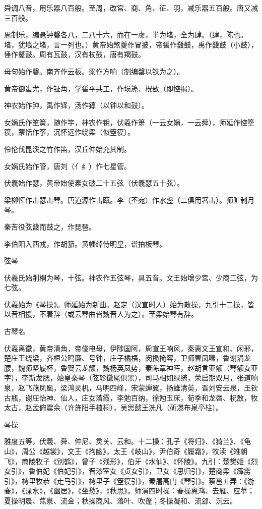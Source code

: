 \documentclass[a4paper,12pt,UTF8,twoside]{ctexbook}
\begin{document}
    舜调八音，用乐器八百般。至周，改宫、商、角、征、羽，减乐器五百般。唐又减三百般。
    
    周制乐，编悬钟磬各八，二八十六，而在一虡，半为堵，全为肆。（肆，陈也。堵，犹墙之堵，言一列也。）黄帝始煞夔作冒披，帝喾作鼗鼓，禹作鼗鼓（小鼓），倕作鼙鼓。周有瓦鼓，汉有杖鼓，唐有羯鼓。
    
    母句始作磬。南齐作云板。梁作方响（制编罄以铁为之）。
    
    黄帝御蚩尤，作钲角，学喾平共工，作埙箎、柷敔（即控揭）。
    
    神农始作钟，禹作铎，汤作錞（以钟以和鼓）。
    
    女娲氏作笙簧，随作竽，神农作钥，伏羲作箫（一云女娲，一云舜），师延作控箜篌，蒙恬作筝，沉怀远作绕梁（似箜篌）。
    
    伶伦伐昆溪之竹作笛，汉丘仲始充其制。
    
    女娲氏始作管，唐刘（亻纟）作七星管。
    
    伏羲始作瑟，黄帝始使素女破二十五弦（伏羲瑟五十弦）。
    
    梁柳恽作击瑟击琴。唐道源作击瓯。李（丕宛）作水盏（二俱用箸击）。师旷制月琴。
    
    秦苦役弦鼗而鼓之，作琵琶。
    
    李伯阳入西戎，作胡笳。黄幡绰侍明皇，谱拍板琴。
    
    弦琴
    
    伏羲氏始削桐为琴，十弦。神农作五弦琴，具五音。文王始增少宫、少商二弦，为七弦。
    
    伏羲始为《琴操》。师延始为新曲。赵定（汉宣时人）始为散操，九引十二操，皆以音相援，不着辞（或云琴曲皆魏晋人为之）。至梁始琴有辞。
    
    古琴名
    
    伏羲离徽，黄帝清角，帝俊电母，伊陟国阿，周宣王响风，秦惠文王宣和、闲邪，楚庄王绕梁，齐桓公鸣廉、号钟，庄子橘梧，闵损掩容，卫师曹凤嗉，鲁谢涓龙腰，魏师坚履杯，鲁贺云龙颔，魏杨英凤势，秦陈章神晖，赵胡言亚额（琴额女亚字），李斯龙腮，始皇秦琴（弦轸徽尾俱黑），司马相如绿绮，荣启期双月，张道响泉，赵飞燕凤凰，梁鸿灵机，马明四峰，宋蒙蝉翼，扬雄清英，晋刘安云泉，王钦古瓶，谢庄怡神、仙人，庄女落霞，李勉百纳，徐勉玉床，荀季和龙唇、柷敔，牧太古，赵孟俯震余（许旌阳手植桐），吴思懿王洗凡（斫瀑布泉亭柱）。
    
    琴操
    
    雅度五等，伏羲、舜、仲尼、灵关、云和。十二操：孔子《将归》、《猗兰》、《龟山》，周公《越裳》，文王《拘幽》，太王《岐山》，尹伯奇《履霜》，牧渎《雉朝飞》，商陵牧子《别鹤》，曾子《残形》，伯牙《水仙》、《怀陵》。九引：楚樊姬《烈女引》，鲁伯妃《伯妃引》，晋漆室女《贞女引》，卫女《思归引》，楚商梁《霹雳引》，樗里牧恭《走马引》，樗里子《箜篌引》，秦屠高门《琴引》。蔡邕五弄：《游春》，《渌水》，《幽居》，《坐愁》，《秋思》。师涓四时操：春操离鸿、去雁、应苹；夏操明晨、焦泉、流金；秋操商风、落叶、吹蓬；冬操凝和、流郐、沉云。
    
\end{document}

